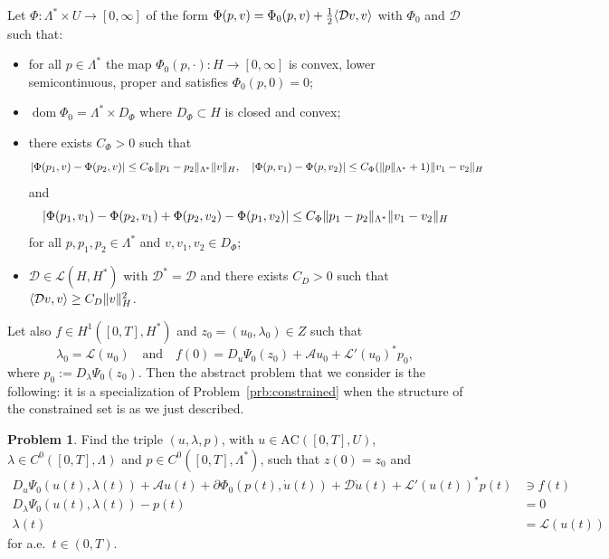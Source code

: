 \documentclass[a4paper,10pt,twoside]{amsbook}
\numberwithin{section}{chapter}
\numberwithin{equation}{chapter}
\theoremstyle{definition}
\newtheorem{prb}[prop]{Problem}
\DeclareMathOperator{\dom}{dom}
\DeclarePairedDelimiter{\norm}{\lVert}{\rVert}
\DeclarePairedDelimiter{\dual}{\langle}{\rangle}
\begin{document}
Let $\Phi\colon\Lambda^*\times U\to[0,\infty]$ of the form $\Phi(p,v)=\Phi_0(p,v)+\frac{1}{2}\dual{\mathcal{D}v,v}$ with $\Phi_0$ and $\mathcal{D}$ such that:
\begin{itemize}
\item[($\Phi$1)] for all $p\in\Lambda^*$ the map $\Phi_0(p,\cdot)\colon H\to[0,\infty]$ is convex, lower semicontinuous, proper and satisfies $\Phi_0(p,0)=0$;
\item[($\Phi$2)] $\dom\Phi_0=\Lambda^*\times D_\Phi$ where $D_\Phi\subset H$ is closed and convex;
\item[($\Phi$3)] there exists $C_\Phi>0$ such that
\[
|\Phi(p_1,v)-\Phi(p_2,v)|\le C_\Phi\norm{p_1-p_2}_{\Lambda^*}\norm{v}_H,\quad|\Phi(p,v_1)-\Phi(p,v_2)|\le C_\Phi(\norm{p}_{\Lambda^*}+1)\norm{v_1-v_2}_H
\]
and
\[
|\Phi(p_1,v_1)-\Phi(p_2,v_1)+\Phi(p_2,v_2)-\Phi(p_1,v_2)|\le C_\Phi\norm{p_1-p_2}_{\Lambda^*}\norm{v_1-v_2}_H
\]
for all $p,p_1,p_2\in\Lambda^*$ and $v,v_1,v_2\in D_\Phi$;
\item[(D)] $\mathcal{D}\in\mathscr{L}(H,H^*)$ with $\mathcal{D}^*=\mathcal{D}$ and there exists $C_D>0$ such that $\dual{\mathcal{D}v,v}\ge C_D\norm{v}_H^2$.
\end{itemize}
Let also $f\in H^1([0,T],H^*)$ and $z_0=(u_0,\lambda_0)\in Z$ such that
\begin{equation}
\label{eqn:initial-stability}
\lambda_0=\mathcal{L}(u_0)\quad\text{and}\quad f(0)=D_u\Psi_0(z_0)+\mathcal{A}u_0+\mathcal{L}'(u_0)^*p_0,
\end{equation}
where $p_0:=D_\lambda\Psi_0(z_0)$. Then the abstract problem that we consider is the following: it is a specialization of Problem~\ref{prb:constrained} when the structure of the constrained set is as we just described.
\begin{prb}
\label{prb:existence-abstract}
Find the triple $(u,\lambda,p)$, with $u\in\text{AC}([0,T],U)$, $\lambda\in C^0([0,T],\Lambda)$ and $p\in C^0([0,T],\Lambda^*)$, such that $z(0)=z_0$ and
\begin{align}
\label{eqn:problem-abstract-first}
D_u\Psi_0(u(t),\lambda(t))+\mathcal{A}u(t)+\partial\Phi_0(p(t),\dot u(t))+\mathcal{D}\dot u(t)+\mathcal{L}'(u(t))^*p(t)&\ni f(t) \\
\label{eqn:problem-abstract-second}
D_\lambda\Psi_0(u(t),\lambda(t))-p(t)&=0 \\
\label{eqn:problem-abstract-third}
\lambda(t)&=\mathcal{L}(u(t))
\end{align}
for a.e.\ $t\in(0,T)$.
\end{prb}
\end{document}
